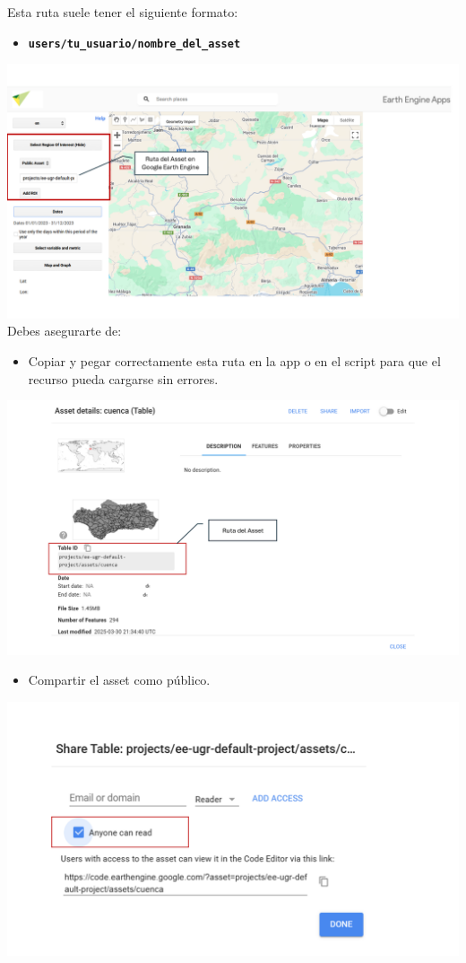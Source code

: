 \documentclass[
]{book}
\providecommand{\tightlist}{%
  \setlength{\itemsep}{0pt}\setlength{\parskip}{0pt}}
\begin{document}
Esta ruta suele tener el siguiente formato:

\begin{itemize}
\tightlist
\item
  \textbf{\texttt{users/tu\_usuario/nombre\_del\_asset}}
\end{itemize}

\includegraphics{assets/asset_es.png}
Debes asegurarte de:

\begin{itemize}
\tightlist
\item
  Copiar y pegar correctamente esta ruta en la app o en el script para que el recurso pueda cargarse sin errores.
\end{itemize}

\includegraphics{assets/asset1_es.png}

\begin{itemize}
\tightlist
\item
  Compartir el asset como público.
\end{itemize}

\includegraphics{assets/asset_2.png}
\end{document}
